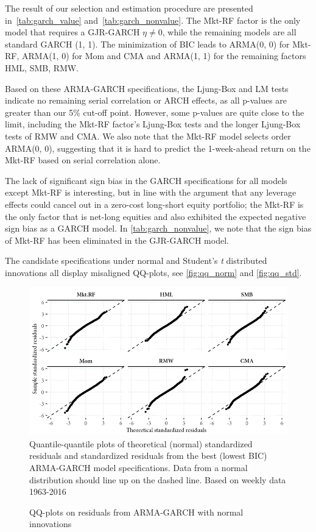 The result of our selection and estimation procedure are presented in~\autoref{tab:garch_value} and~\autoref{tab:garch_nonvalue}. The Mkt-RF factor is the only model that requires a GJR-GARCH $\eta \neq 0$, while the remaining models are all standard GARCH (1, 1). The minimization of BIC leads to ARMA(0, 0) for Mkt-RF, ARMA(1, 0) for Mom and CMA and ARMA(1, 1) for the remaining factors HML, SMB, RMW. 

Based on these ARMA-GARCH specifications, the Ljung-Box and LM tests indicate no remaining serial correlation or ARCH effects, as all p-values are greater than our 5\% cut-off point. However, some p-values are quite close to the limit, including the Mkt-RF factor's Ljung-Box tests and the longer Ljung-Box tests of RMW and CMA. We also note that the Mkt-RF model selects order ARMA(0, 0), suggesting that it is hard to predict the 1-week-ahead return on the Mkt-RF based on serial correlation alone.

The lack of significant sign bias in the GARCH specifications for all models except Mkt-RF is interesting, but in line with the argument that any leverage effects could cancel out in a zero-cost long-short equity portfolio; the Mkt-RF is the only factor that is net-long equities and also exhibited the expected negative sign bias as a GARCH model. In \autoref{tab:garch_nonvalue}, we note that the sign bias of Mkt-RF has been eliminated in the GJR-GARCH model. 

The candidate specifications under normal and Student's \textit{t} distributed innovations all display misaligned QQ-plots, see \autoref{fig:qq_norm} and \autoref{fig:qq_std}.

\begin{figure}[H]
  \caption{QQ-plots on residuals from ARMA-GARCH with normal innovations}
  \label{fig:qq_norm}
  \centering
  \begin{minipage}{\textwidth}
  \includegraphics[scale=1]{graphics/qq_norm.png}  
  \vspace{3mm}
  \footnotesize
  Quantile-quantile plots of theoretical (normal) standardized residuals and standardized residuals from the best (lowest BIC) ARMA-GARCH model specifications. Data from a normal distribution should line up on the dashed line. Based on weekly data 1963-2016
  \end{minipage}
\end{figure}

